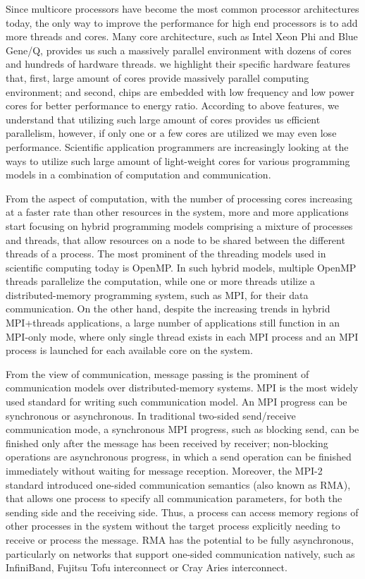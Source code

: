 Since multicore processors have become the most common processor architectures today, the only way to
improve the performance for high end processors is to add more threads
and cores. Many core architecture, such as Intel Xeon Phi and Blue Gene/Q,
provides us such a massively parallel environment with dozens of cores and
hundreds of hardware threads. we highlight their specific hardware features
that, first, large amount of cores provide massively parallel computing
environment; and second, chips are embedded with low frequency and low power
cores for better performance to energy ratio.
According to above features, we understand that utilizing such large amount
of cores provides us efficient parallelism,
however, if only one or a few cores are utilized we may even lose performance.
Scientific application programmers are increasingly looking at the ways to
utilize such large amount of light-weight cores for various programming
models in a combination of computation and communication.

From the aspect of computation, with the number of processing cores increasing at
a faster rate than other resources in the system, more and more applications
start focusing on hybrid programming models comprising a mixture of processes
and threads, that allow resources on a node to be shared between the different
threads of a process. The most prominent of the
threading models used in scientific computing today is OpenMP. In such hybrid models,
multiple OpenMP threads parallelize the computation, while one or more threads
utilize a distributed-memory programming system, such as MPI, for their data
communication.
On the other hand, despite the increasing trends in hybrid MPI+threads
applications, a large number of applications still function in an MPI-only
mode, where only single thread exists in each MPI process and an MPI process
is launched for each available core on the system.

From the view of communication, message passing is the prominent of communication
models over distributed-memory systems. MPI is the most widely used standard for
writing such communication model. An MPI progress can be synchronous or asynchronous.
In traditional two-sided send\slash receive communication mode, a synchronous MPI progress, such as
blocking send, can be finished only after the message has been received by receiver;
non-blocking operations are asynchronous progress, in which a send
operation can be finished immediately without waiting for message reception.
Moreover, the MPI-2 standard introduced one-sided communication semantics (also known as RMA),
that allows one process to specify all communication parameters, for both the
sending side and the receiving side. Thus, a process can access memory regions
of other processes in the system without the target process explicitly needing
to receive or process the message. RMA has the potential to be fully asynchronous,
particularly on networks that support one-sided communication natively,
such as InfiniBand, Fujitsu Tofu interconnect or Cray Aries interconnect.

